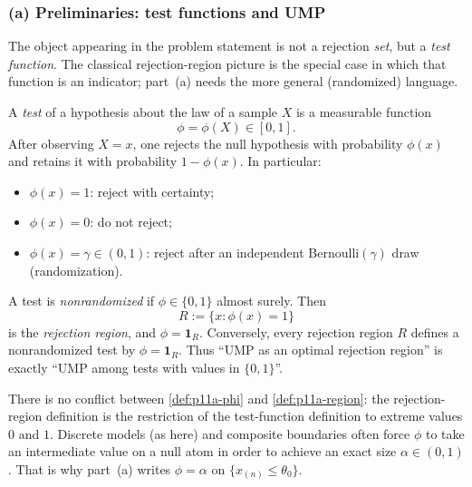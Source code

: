 \documentclass[11pt,a4paper]{article}
\begin{document}
\setcounter{section}{11}
\setcounter{theorem}{0}
\setcounter{definition}{0}
\setcounter{remark}{0}
\setcounter{note}{0}

\subsubsection{(a) Preliminaries: test functions and UMP}

The object appearing in the problem statement is not a rejection \emph{set}, but a \emph{test function}. The classical rejection-region picture is the special case in which that function is an indicator; part~(a) needs the more general (randomized) language.

\begin{definition}
\label{def:p11a-phi}
A \emph{test} of a hypothesis about the law of a sample \(X\) is a measurable function
\[
\phi
=
\phi(X)
\in[0,1].
\]
After observing \(X=x\), one rejects the null hypothesis with probability \(\phi(x)\) and retains it with probability \(1-\phi(x)\). In particular:
\begin{itemize}
    \item \(\phi(x)=1\): reject with certainty;
    \item \(\phi(x)=0\): do not reject;
    \item \(\phi(x)=\gamma\in(0,1)\): reject after an independent Bernoulli\((\gamma)\) draw (randomization).
\end{itemize}
\end{definition}

\begin{definition}
\label{def:p11a-region}
A test is \emph{nonrandomized} if \(\phi\in\{0,1\}\) almost surely. Then
\[
R:=\{x:\phi(x)=1\}
\]
is the \emph{rejection region}, and \(\phi=\mathbf{1}_R\). Conversely, every rejection region \(R\) defines a nonrandomized test by \(\phi=\mathbf{1}_R\). Thus ``UMP as an optimal rejection region'' is exactly ``UMP among tests with values in \(\{0,1\}\)''.
\end{definition}

\begin{remark*}
There is no conflict between \cref{def:p11a-phi} and \cref{def:p11a-region}: the rejection-region definition is the restriction of the test-function definition to extreme values \(0\) and \(1\). Discrete models (as here) and composite boundaries often force \(\phi\) to take an intermediate value on a null atom in order to achieve an exact size \(\alpha\in(0,1)\). That is why part~(a) writes \(\phi=\alpha\) on \(\{x_{(n)}\le\theta_0\}\).
\end{remark*}
\end{document}
